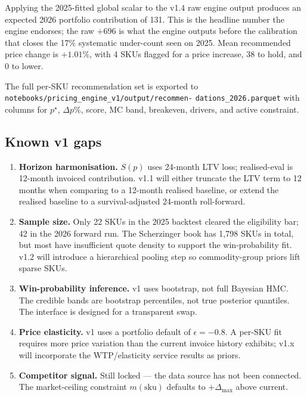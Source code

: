 \documentclass[11pt,a4paper]{article}
\newcommand{\sku}{\mathrm{sku}}
\begin{document}
Applying the 2025-fitted global scalar to the v1.4 raw engine output produces an expected 2026 portfolio contribution of 131. This is the headline number the engine endorses; the raw $+$696 is what the engine outputs before the calibration that closes the 17\% systematic under-count seen on 2025. Mean recommended price change is $+1.01\%$, with 4 SKUs flagged for a price increase, 38 to hold, and 0 to lower.

The full per-SKU recommendation set is exported to \texttt{notebooks/pricing\_engine\_v1/output/recommen-} \texttt{dations\_2026.parquet} with columns for $p^\star$, $\Delta p\%$, score, MC band, breakeven, drivers, and active constraint.

\subsection{Known v1 gaps}
\begin{enumerate}[leftmargin=2em,itemsep=2pt]
\item \textbf{Horizon harmonisation.} $S(p)$ uses 24-month LTV loss; realised-eval is 12-month invoiced contribution. v1.1 will either truncate the LTV term to 12 months when comparing to a 12-month realised baseline, or extend the realised baseline to a survival-adjusted 24-month roll-forward.
\item \textbf{Sample size.} Only 22 SKUs in the 2025 backtest cleared the eligibility bar; 42 in the 2026 forward run. The Scherzinger book has 1{,}798 SKUs in total, but most have insufficient quote density to support the win-probability fit. v1.2 will introduce a hierarchical pooling step so commodity-group priors lift sparse SKUs.
\item \textbf{Win-probability inference.} v1 uses bootstrap, not full Bayesian HMC. The credible bands are bootstrap percentiles, not true posterior quantiles. The interface is designed for a transparent swap.
\item \textbf{Price elasticity.} v1 uses a portfolio default of $\epsilon = -0.8$. A per-SKU fit requires more price variation than the current invoice history exhibits; v1.x will incorporate the WTP/elasticity service results as priors.
\item \textbf{Competitor signal.} Still locked --- the data source has not been connected. The market-ceiling constraint $m(\sku)$ defaults to $+\Delta_{\max}$ above current.
\end{enumerate}

\end{document}

